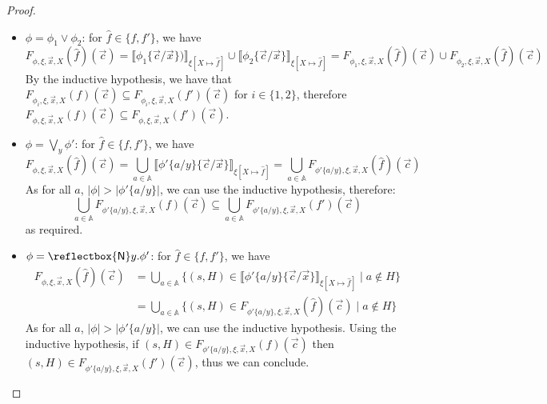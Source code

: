 \documentclass[10pt,a4paper]{article}
\theoremstyle{definition}
\theoremstyle{remark}
\newcommand\new[0]{\reflectbox{\ensuremath{\mathsf{N}}}}
\newcommand\fresh[1]{\new #1.}
\newcommand\sem[2][\xi]{\llbracket#2\rrbracket_{#1}}
\newcommand\Atoms{\mathbb{A}}
\newcommand\gap{&\,\,}
\newcommand{\F}[4][\xi]{F_{#2,#1,#3,#4}}
\begin{document}
\begin{proof}
\begin{itemize}
\begin{align*}
		\end{align*}
		By the inductive hypothesis, we have that $\F{\phi'}{\vec x}{X}(f) \sqsupseteq \F{\phi'}{\vec x}{X}(f')$, meaning for all $\vec c \in \Atoms^{|\vec x|}$, we have that
		\begin{align*}
			\gap\F{\phi'}{\vec x}{X}(f)(\vec c) \supseteq \F{\phi'}{\vec x}{X}(f')(\vec c) \\
			\therefore\gap\F{\phi}{\vec x}{X}(f)(\vec c) \subseteq \F{\phi}{\vec x}{X}(f')(\vec c)
		\end{align*}
		as required.
		Note we use the second inductive hypothesis as $\lnot \phi'$ has one more negation than $\phi'$.
				\item $\phi = \phi_1 \lor \phi_2$: for $\hat f \in \{f, f'\}$, we have
		\[
		\F{\phi}{\vec x}{X}(\hat f)(\vec c) = \sem[{\xi[X\mapsto \hat f]}]{\phi_1\{\vec c / \vec x\})} \cup \sem[{\xi[X\mapsto \hat f]}]{\phi_2\{\vec c / \vec x\}} = \F{\phi_1}{\vec x}{X}(\hat f)(\vec c) \cup \F{\phi_2}{\vec x}{X}(\hat f)(\vec c)
		\]
		By the inductive hypothesis, we have that $\F{\phi_i}{\vec x}{X}(f)(\vec c) \subseteq \F{\phi_i}{\vec x}{X}(f')(\vec c)$ for $i \in \{1,2\}$,
		therefore
		$\F{\phi}{\vec x}{X}(f)(\vec c)\subseteq \F{\phi}{\vec x}{X}(f')(\vec c)$.
		\item $\phi = \bigvee_{y} \phi'$: for $\hat f \in \{f,f'\}$, we have
		\[
		\F{\phi}{\vec x}{X}(\hat f)(\vec c) = \bigcup_{a\in \Atoms}\sem[{\xi[X\mapsto \hat f]}]{\phi'\{a/y\}\{\vec c / \vec x\}} = \bigcup_{a \in \Atoms}\F{\phi'\{a/y\}}{\vec x}{X}(\hat f)(\vec c)
		\]
		As for all $a$, $|\phi| > |\phi'\{a/y\}|$, we can use the inductive hypothesis, therefore:    \[
		\bigcup_{a \in \Atoms}\F{\phi'\{a/y\}}{\vec x}{X}(f)(\vec c) \subseteq  \bigcup_{a \in \Atoms}\F{\phi'\{a/y\}}{\vec x}{X}(f')(\vec c)
		\]
		as required.
	    \item $\phi = \fresh{y} \phi'$: for $\hat f \in \{f,f'\}$, we have
		\begin{align*}
			\F{\phi}{\vec x}{X}(\hat f)(\vec c) &= \bigcup_{a\in \Atoms}\{(s, H) \in \sem[{\xi[X\mapsto \hat f]}]{\phi'\{a/y\}\{\vec c/\vec x\}} \mid a \notin H\} 
			\\ &= \bigcup_{a \in \Atoms}\{(s, H) \in \F{\phi'\{a/y\}}{\vec x}{X}(\hat f)(\vec c) \mid a \notin H\}
		\end{align*}
		As for all $a$, $|\phi| > |\phi'\{a/y\}|$, we can use the inductive hypothesis.
		Using the inductive hypothesis, if $(s, H) \in \F{\phi'\{a/y\}}{\vec x}{X}(f)(\vec c)$ then $(s, H) \in \F{\phi'\{a/y\}}{\vec x}{X}(f')(\vec c)$, thus we can conclude.

\end{itemize}
\end{proof}
\end{document}
